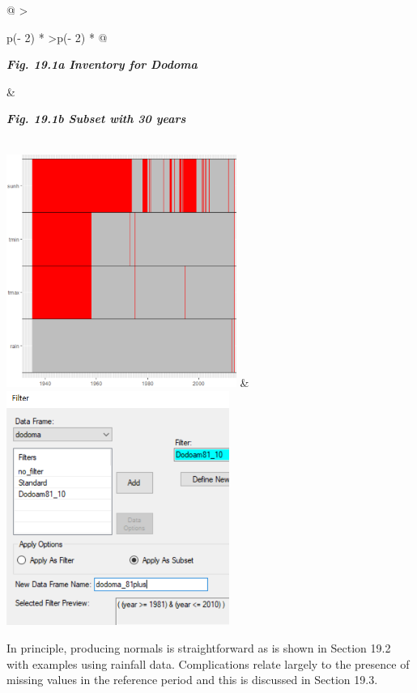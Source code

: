 \documentclass[
  letterpaper,
  DIV=11,
  numbers=noendperiod]{scrreprt}
\begin{document}
\begin{longtable}[]{@{}
  >{\raggedright\arraybackslash}p{(\columnwidth - 2\tabcolsep) * }
  >{\raggedleft\arraybackslash}p{(\columnwidth - 2\tabcolsep) * }@{}}
\toprule\noalign{}
\begin{minipage}[b]{\linewidth}\raggedright
\textbf{\emph{Fig. 19.1a Inventory for Dodoma}}
\end{minipage} & \begin{minipage}[b]{\linewidth}\raggedleft
\textbf{\emph{Fig. 19.1b Subset with 30 years}}
\end{minipage} \\
\midrule\noalign{}
\endhead
\bottomrule\noalign{}
\endlastfoot
\includegraphics[width=2.95767in,height=2.99414in]{figures/Fig19.1a.png}
&
\includegraphics[width=2.86941in,height=3.01892in]{figures/Fig19.1b.png} \\
\end{longtable}

In principle, producing normals is straightforward as is shown in
Section 19.2 with examples using rainfall data. Complications relate
largely to the presence of missing values in the reference period and
this is discussed in Section 19.3.
\end{document}
